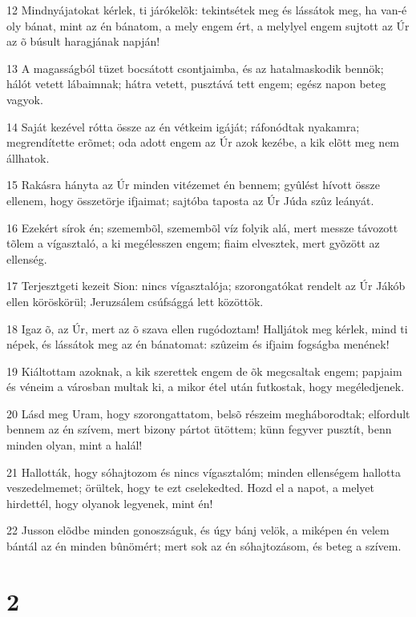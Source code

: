 \par 12 Mindnyájatokat kérlek, ti járókelõk: tekintsétek meg és lássátok meg, ha van-é oly bánat, mint az én bánatom, a mely engem ért, a melylyel engem sujtott az Úr az õ búsult haragjának napján!
\par 13 A magasságból tüzet bocsátott csontjaimba, és az hatalmaskodik bennök; hálót vetett lábaimnak; hátra vetett, pusztává tett engem; egész napon beteg vagyok.
\par 14 Saját kezével rótta össze az én vétkeim igáját; ráfonódtak nyakamra; megrendítette erõmet; oda adott engem az Úr azok kezébe, a kik elõtt meg nem állhatok.
\par 15 Rakásra hányta az Úr minden vitézemet én bennem; gyûlést hívott össze ellenem, hogy összetörje ifjaimat; sajtóba taposta az Úr Júda szûz leányát.
\par 16 Ezekért sírok én; szemembõl, szemembõl víz folyik alá, mert messze távozott tõlem a vígasztaló, a ki megélesszen engem; fiaim elvesztek, mert gyõzött az ellenség.
\par 17 Terjesztgeti kezeit Sion: nincs vígasztalója; szorongatókat rendelt az Úr Jákób ellen köröskörül; Jeruzsálem csúfsággá lett közöttök.
\par 18 Igaz õ, az Úr, mert az õ szava ellen rugódoztam! Halljátok meg kérlek, mind ti népek, és lássátok meg az én bánatomat: szûzeim és ifjaim fogságba menének!
\par 19 Kiáltottam azoknak, a kik szerettek engem de õk megcsaltak engem; papjaim és véneim a városban multak ki, a mikor étel után futkostak, hogy megéledjenek.
\par 20 Lásd meg Uram, hogy szorongattatom, belsõ részeim megháborodtak; elfordult bennem az én szívem, mert bizony pártot ütöttem; künn fegyver pusztít, benn minden olyan, mint a halál!
\par 21 Hallották, hogy sóhajtozom és nincs vígasztalóm; minden ellenségem hallotta veszedelmemet; örültek, hogy te ezt cselekedted. Hozd el a napot, a melyet hirdettél, hogy olyanok legyenek, mint én!
\par 22 Jusson elõdbe minden gonoszságuk, és úgy bánj velök, a miképen én velem bántál az én minden bûnömért; mert sok az én sóhajtozásom, és beteg a szívem.

\chapter{2}

